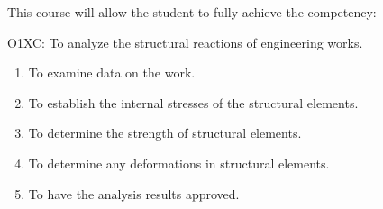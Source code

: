 {This course will allow the student to fully achieve the competency:

O1XC:  To analyze the structural reactions of engineering works.
\begin{enumerate}
\item To examine data on the work.
\item To establish the internal stresses of the structural elements.
\item To determine the strength of structural elements.
\item To determine any deformations in structural elements.
\item To have the analysis results approved.
\end{enumerate}
}